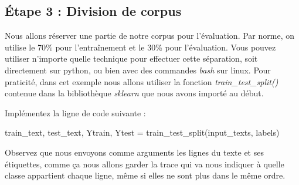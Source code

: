 








\subsection{Étape 3 : Division de corpus}

Nous allons réserver une partie de notre corpus pour l'évaluation. Par norme, on utilise le 70\% pour l'entraînement et le 30\% pour l'évaluation. Vous pouvez utiliser n'importe quelle technique pour effectuer cette séparation, soit directement sur python, ou bien avec des commandes \textit{bash} sur linux. Pour praticité, dans cet exemple nous allons utiliser la fonction \textit{train\_test\_split()} contenue dans la bibliothèque \textit{sklearn} que nous avons importé au début. 

Implémentez la ligne de code suivante :

\begin{python}
train_text, test_text, Ytrain, Ytest = 
train_test_split(input_texts, labels)
\end{python}
Observez que nous envoyons comme arguments les lignes du texte et ses étiquettes, comme ça nous allons garder la trace qui va nous indiquer à quelle classe appartient chaque ligne, même si elles ne sont plus dans le même ordre.

